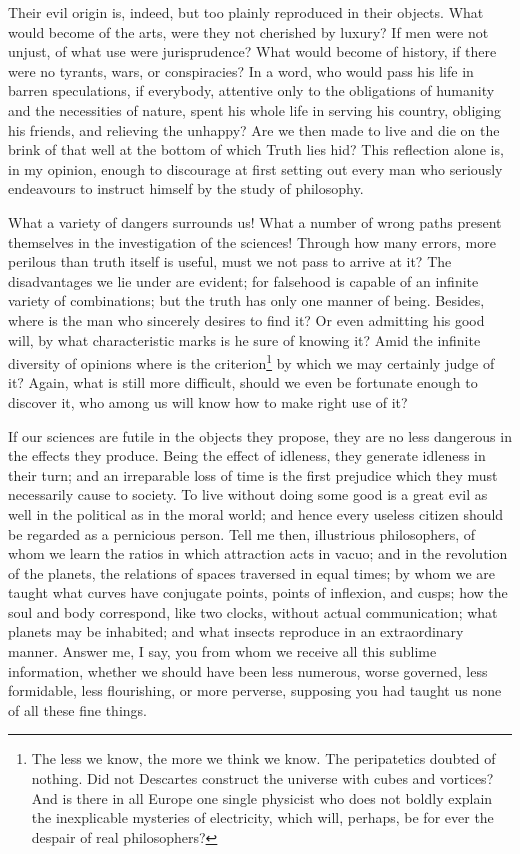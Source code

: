 Their evil origin is, indeed, but too plainly reproduced in
their objects. What would become of the arts, were they not cherished
by luxury? If men were not unjust, of what use were jurisprudence?
What would become of history, if there were no tyrants, wars, or
conspiracies? In a word, who would pass his life in barren
speculations, if everybody, attentive only to the obligations of
humanity and the necessities of nature, spent his whole life in
serving his country, obliging his friends, and relieving the unhappy?
Are we then made to live and die on the brink of that well at the
bottom of which Truth lies hid? This reflection alone is, in my
opinion, enough to discourage at first setting out every man who
seriously endeavours to instruct himself by the study of philosophy.

What a variety of dangers surrounds us! What a number of wrong paths
present themselves in the investigation of the sciences! Through how
many errors, more perilous than truth itself is useful, must we not
pass to arrive at it? The disadvantages we lie under are evident; for
falsehood is capable of an infinite variety of combinations; but the
truth has only one manner of being. Besides, where is the man who
sincerely desires to find it? Or even admitting his good will, by what
characteristic marks is he sure of knowing it? Amid the infinite
diversity of opinions where is the criterion\footnote{The less we
know, the more we think we know. The peripatetics doubted of nothing.
Did not Descartes construct the universe with cubes and vortices? And
is there in all Europe one single physicist who does not boldly
explain the inexplicable mysteries of electricity, which will,
perhaps, be for ever the despair of real philosophers?} by which we
may certainly judge of it? Again, what is still more difficult, should
we even be fortunate enough to discover it, who among us will know how
to make right use of it?

If our sciences are futile in the objects they propose, they are no
less dangerous in the effects they produce. Being the effect of
idleness, they generate idleness in their turn; and an irreparable
loss of time is the first prejudice which they must necessarily cause
to society. To live without doing some good is a great evil as well in
the political as in the moral world; and hence every useless citizen
should be regarded as a pernicious person. Tell me then, illustrious
philosophers, of whom we learn the  ratios in which
attraction acts in vacuo; and in the revolution of the planets, the
relations of spaces traversed in equal times; by whom we are taught
what curves have conjugate points, points of inflexion, and cusps; how
the soul and body correspond, like two clocks, without actual
communication; what planets may be inhabited; and what insects
reproduce in an extraordinary manner. Answer me, I say, you from whom
we receive all this sublime information, whether we should have been
less numerous, worse governed, less formidable, less flourishing, or
more perverse, supposing you had taught us none of all these fine
things.

